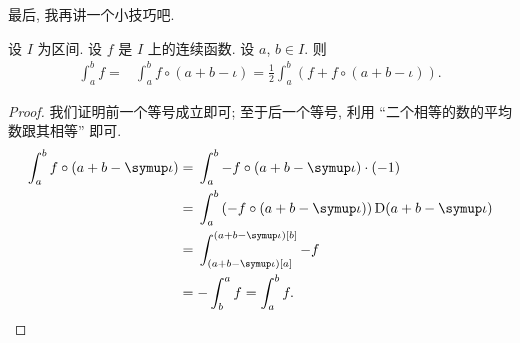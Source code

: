 最后, 我再讲一个小技巧吧.

\begin{theorem}
    设 $I$ 为区间. 设 $f$ 是 $I$ 上的连续函数. 设 $a$, $b \in I$. 则
    \begin{align*}
        \int_{a}^{b} {f}
        = {} & \int_{a}^{b} {f \circ (a + b - \iota)}
        = \frac{1}{2} \int_{a}^{b} {(f + f \circ (a + b - \iota))}.
    \end{align*}
\end{theorem}

\begin{proof}
    我们证明前一个等号成立即可; 至于后一个等号, 利用 ``二个相等的数的平均数跟其相等'' 即可.
    \begin{align*}
        \int_{a}^{b} {f \circ (a + b - \iota)}
        = {} & \int_{a}^{b} {-f \circ (a + b - \iota) \cdot (-1)}                    \\
        = {} & \int_{a}^{b} {(-f \circ (a + b - \iota))\,\mathrm{D} (a + b - \iota)} \\
        = {} & \int_{(a + b - \iota)[a]}^{(a + b - \iota)[b]} {-f}                   \\
        = {} & {-\int_{b}^{a} {f}}
        = \int_{a}^{b} {f}. \qedhere
    \end{align*}
\end{proof}

